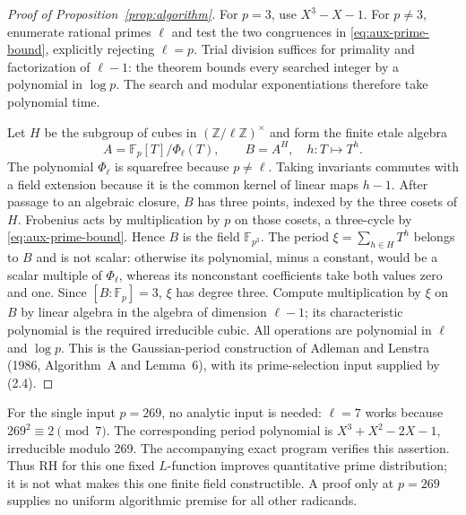 \documentclass[11pt]{article}
\newcommand{\Z}{\mathbb Z}
\newcommand{\F}{\mathbb F}
\begin{document}
\begin{proof}[Proof of Proposition~\ref{prop:algorithm}]
For $p=3$, use $X^3-X-1$. For $p\ne3$, enumerate rational primes
$\ell$ and test the two congruences in \eqref{eq:aux-prime-bound}, explicitly rejecting
$\ell=p$. Trial division suffices for primality and factorization
of $\ell-1$: the theorem bounds every searched integer by a
polynomial in $\log p$. The search and modular exponentiations
therefore take polynomial time.

Let $H$ be the subgroup of cubes in $(\Z/\ell\Z)^\times$ and form
the finite etale algebra
\[
 A=\F_p[T]/\Phi_\ell(T),\qquad B=A^H,
 \quad h:T\longmapsto T^h .
\]
The polynomial $\Phi_\ell$ is squarefree because $p\ne\ell$.
Taking invariants commutes with a field extension because it is
the common kernel of linear maps $h-1$. After passage to an
algebraic closure, $B$ has three points,
indexed by the three cosets of $H$. Frobenius acts by multiplication
by $p$ on those cosets, a three-cycle by \eqref{eq:aux-prime-bound}. Hence $B$ is the
field $\F_{p^3}$.
The period $\xi=\sum_{h\in H}T^h$ belongs to $B$ and is not scalar:
otherwise its polynomial, minus a constant, would be a scalar
multiple of $\Phi_\ell$, whereas its nonconstant coefficients
take both values zero and one. Since $[B:\F_p]=3$, $\xi$ has
degree three. Compute multiplication by $\xi$ on $B$ by linear
algebra in the algebra of dimension $\ell-1$; its characteristic
polynomial is the required irreducible cubic. All operations
are polynomial in $\ell$ and $\log p$.
This is the Gaussian-period construction of Adleman and
Lenstra (1986, Algorithm~A and Lemma~6), with its prime-selection
input supplied by (2.4).
\end{proof}

For the single input $p=269$, no analytic input is needed:
$\ell=7$ works because $269^2\equiv2\pmod7$. The corresponding
period polynomial is $X^3+X^2-2X-1$, irreducible modulo 269.
The accompanying exact program verifies this assertion.
Thus RH for this one fixed $L$-function improves quantitative
prime distribution; it is not what makes this one finite field
constructible. A proof only at $p=269$ supplies no uniform
algorithmic premise for all other radicands.
\end{document}
